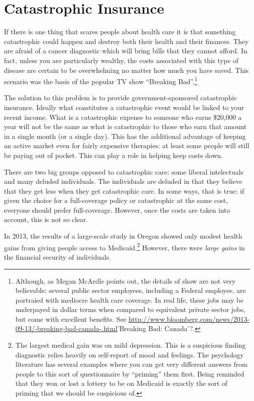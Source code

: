 \section{Catastrophic Insurance}

If there is one thing that scares people about health care it is that something
catastrophic could happen and destroy both their health and their finances.
They are afraid of a cancer diagnostic which will bring bills that they cannot
afford. In fact, unless you are particularly wealthy, the costs associated with
this type of disease are certain to be overwhelming no matter how much you have
saved. This scenario was the basis of the popular TV show ``Breaking
Bad''.\footnote{Although, as Megan McArdle points out, the details of show are
not very believable: several public sector employees, including a Federal
employee, are portraied with mediocre health care coverage. In real life, these
jobs may be underpayed in dollar terms when compared to equivalent private
sector jobs, but come with excellent benefits. See
\url{http://www.bloomberg.com/news/2013-09-13/-breaking-bad-canada-.html}{'Breaking
Bad: Canada'?}.}

The solution to this problem is to provide government-sponsored catastrophic
insurance. Ideally what constitutes a catastrophic event would be linked to
your recent income. What is a catastrophic expense to someone who earns
\$20,000 a year will not be the same as what is catastrophic to those who earn
that amount in a single month (or a single day). This has the additional
advantage of keeping an active market even for fairly expensive therapies: at
least some people will still be paying out of pocket. This can play a role in
helping keep costs down.

There are two big groups opposed to catastrophic care: some liberal
intelectuals and many deluded individuals. The individuals are deluded in that
they believe that they get less when they get catastrophic care. In some ways,
that is true: if given the choice for a full-coverage policy or catastrophic at
the same cost, everyone should prefer full-coverage. However, once the costs
are taken into account, this is not so clear.

In 2013, the results of a large-scale study in Oregon showed only modest health
gains from giving people access to Medicaid.\footnote{The largest medical gain
was on mild depression. This is a suspicious finding diagnostic relies heavily
on self-report of mood and feelings. The psychology literature has several
examples where you can get very different answers from people to this sort of
questionnaire by ``priming'' them first. Being reminded that they won or lost a
lottery to be on Medicaid is exactly the sort of priming that we should be
suspicious of.} However, there were \emph{large gains} in the financial
security of individuals.

